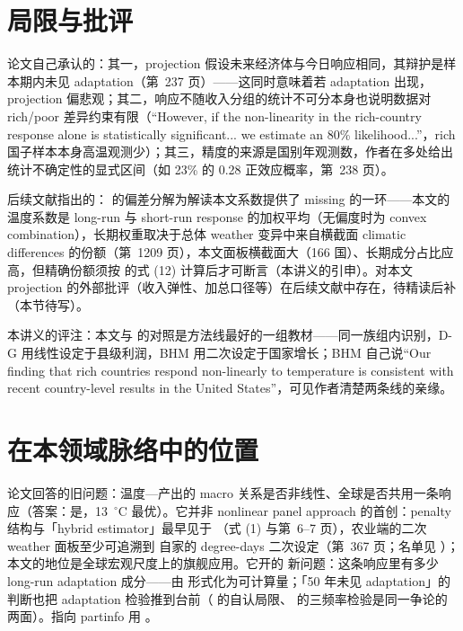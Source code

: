 \section{局限与批评}

论文自己承认的：其一，projection 假设未来经济体与今日响应相同，其辩护是样本期内未见 adaptation（第~237 页）——这同时意味着若 adaptation 出现，projection 偏悲观；其二，响应不随收入分组的统计不可分本身也说明数据对 rich/poor 差异约束有限（``However, if the non-linearity in the rich-country response alone is statistically significant... we estimate an 80\% likelihood...''\citep[第~237 页]{burke2015global}，rich 国子样本本身高温观测少）；其三，精度的来源是国别年观测数，作者在多处给出统计不确定性的显式区间（如 23\% 的 0.28 正效应概率，第~238 页）。

后续文献指出的：\citet{merel2021climate} 的偏差分解为解读本文系数提供了 missing 的一环——本文的温度系数是 long-run 与 short-run response 的加权平均（无偏度时为 convex combination），长期权重取决于总体 weather 变异中来自横截面 climatic differences 的份额（第~1209 页），本文面板横截面大（166 国）、长期成分占比应高，但精确份额须按  的式 (12) 计算后才可断言（本讲义的引申）。对本文 projection 的外部批评（收入弹性、加总口径等）在后续文献中存在，待精读后补（本节待写）。

本讲义的评注：本文与  的对照是方法线最好的一组教材——同一族组内识别，D-G 用线性设定于县级利润，BHM 用二次设定于国家增长；BHM 自己说``Our finding that rich countries respond non-linearly to temperature is consistent with recent country-level results in the United States''\citep[第~237 页]{burke2015global}，可见作者清楚两条线的亲缘。

\section{在本领域脉络中的位置}

论文回答的旧问题：温度—产出的 macro 关系是否非线性、全球是否共用一条响应（答案：是，13~$^\circ$C 最优）。它并非 nonlinear panel approach 的首创：penalty 结构与「hybrid estimator」最早见于 \citet{mcintosh2006identifying}（式 (1) 与第~6--7 页），农业端的二次 weather 面板至少可追溯到 \citet{deschenes2007economic} 自家的 degree-days 二次设定（第~367 页；名单见 \citealp[第~1214 页脚注~15]{merel2021climate}）；本文的地位是全球宏观尺度上的旗舰应用。它开的 新问题：这条响应里有多少 long-run adaptation 成分——由  形式化为可计算量；「50 年未见 adaptation」的判断也把 adaptation 检验推到台前（ 的自认局限、 的三频率检验是同一争论的两面）。指向 partinfo 用 。

\chapterrefs
